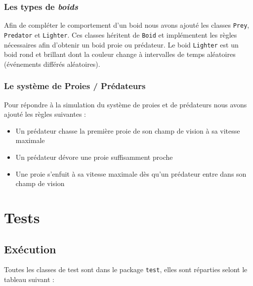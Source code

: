 \documentclass [a4paper,11pt,titlepage] {article}
\begin{document}
\subsubsection {Les types de {\em boids}}

Afin de compléter le comportement d'un boid nous avons ajouté les classes \texttt{Prey}, \texttt{Predator} et \texttt{Lighter}. Ces classes héritent de \texttt{Boid} et implémentent les règles nécessaires afin d'obtenir un boid proie ou prédateur. Le boid \texttt{Lighter} est un boid rond et brillant dont la couleur change à intervalles de temps aléatoires (événements différés aléatoires).


\subsubsection {Le système de Proies / Prédateurs}

Pour répondre à la simulation du système de proies et de prédateurs nous avons ajouté les règles suivantes :
\begin{itemize}
\item Un prédateur chasse la première proie de son champ de vision à sa vitesse maximale
\item Un prédateur dévore une proie suffisamment proche
\item Une proie s'enfuit à sa vitesse maximale dès qu'un prédateur entre dans son champ de vision
\end{itemize}

\section {Tests}

\subsection {Exécution}
Toutes les classes de test sont dans le package \texttt{test}, elles sont réparties selont le tableau suivant :
\end{document}
